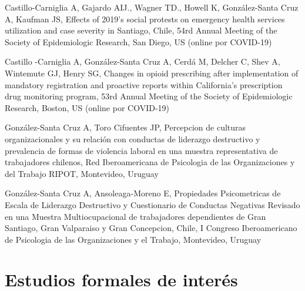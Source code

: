 \documentclass[11pt,a4paper,]{awesome-cv}
\begin{document}
\begin{cventries}
{\begin{cvitems}
\item Castillo-Carniglia A, Gajardo AIJ., Wagner TD., Howell K, González-Santa Cruz A, Kaufman JS, Effects of 2019's social protests on emergency health services utilization and case severity in Santiago, Chile, 54rd Annual Meeting of the Society of Epidemiologic Research, San Diego, US (online por COVID-19)
\item Castillo -Carniglia A, González-Santa Cruz A, Cerdá M, Delcher C, Shev A, Wintemute GJ, Henry SG, Changes in opioid prescribing after implementation of mandatory registration and proactive reports within California's prescription drug monitoring program, 53rd Annual Meeting of the Society of Epidemiologic Research, Boston, US (online por COVID-19)
\item González-Santa Cruz A, Toro Cifuentes JP, Percepcion de culturas organizacionales y su relación con conductas de liderazgo destructivo y prevalencia de formas de violencia laboral en una muestra representativa de trabajadores chilenos, Red Iberoamericana de Psicologia de las Organizaciones y del Trabajo RIPOT, Montevideo, Uruguay
\item González-Santa Cruz A, Ansoleaga-Moreno E, Propiedades Psicometricas de Escala de Liderazgo Destructivo y Cuestionario de Conductas Negativas Revisado en una Muestra Multiocupacional de trabajadores dependientes de Gran Santiago, Gran Valparaiso y Gran Concepcion, Chile, I Congreso Iberoamericano de Psicologia de las Organizaciones y el Trabajo, Montevideo, Uruguay
\end{cvitems}}
\end{cventries}

\section{Estudios formales de
interés}\label{estudios-formales-de-interuxe9s}

\fontsize{10pt}{1.5em}\color{text}
\begin{cventries}
    \vspace{-4.0mm}
    \vspace{-4.0mm}
    \vspace{-4.0mm}
    \vspace{-4.0mm}
    \vspace{-4.0mm}
\end{cventries}
\end{document}
